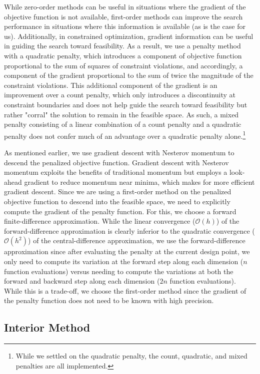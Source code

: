 \documentclass[conference]{IEEEtran}
\begin{document}
While zero-order methods can be useful in situations where the gradient of the objective function is not available, first-order methods can improve the search performance in situations where this information is available (as is the case for us). Additionally, in constrained optimization, gradient information can be useful in guiding the search toward feasibility. As a result, we use a penalty method with a quadratic penalty, which introduces a component of objective function proportional to the sum of squares of constraint violations, and accordingly, a component of the gradient proportional to the sum of twice the magnitude of the constraint violations. This additional component of the gradient is an improvement over a count penalty, which only introduces a discontinuity at constraint boundaries and does not help guide the search toward feasibility but rather "corral" the solution to remain in the feasible space. As such, a mixed penalty consisting of a linear combination of a count penalty and a quadratic penalty does not confer much of an advantage over a quadratic penalty alone.\footnote{While we settled on the quadratic penalty, the count, quadratic, and mixed penalties are all implemented.}

As mentioned earlier, we use gradient descent with Nesterov momentum to descend the penalized objective function. Gradient descent with Nesterov momentum exploits the benefits of traditional momentum but employs a look-ahead gradient to reduce momentum near minima, which makes for more efficient gradient descent. Since we are using a first-order method on the penalized objective function to descend into the feasible space, we need to explicitly compute the gradient of the penalty function. For this, we choose a forward finite-difference approximation. While the linear convergence ($\mathcal{O}(h)$) of the forward-difference approximation is clearly inferior to the quadratic convergence ($\mathcal{O}(h^2)$) of the central-difference approximation, we use the forward-difference approximation since after evaluating the penalty at the current design point, we only need to compute its variation at the forward step along each dimension ($n$ function evaluations) versus needing to compute the variations at both the forward and backward step along each dimension ($2n$ function evaluations). While this is a trade-off, we choose the first-order method since the gradient of the penalty function does not need to be known with high precision.

\subsection{Interior Method}
\end{document}
